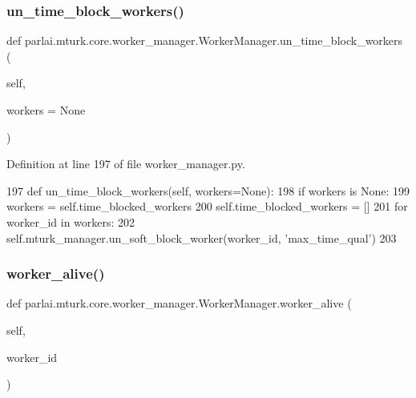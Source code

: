 \subsubsection{\texorpdfstring{un\+\_\+time\+\_\+block\+\_\+workers()}{un\_time\_block\_workers()}}
{\footnotesize\ttfamily def parlai.\+mturk.\+core.\+worker\+\_\+manager.\+Worker\+Manager.\+un\+\_\+time\+\_\+block\+\_\+workers (\begin{DoxyParamCaption}\item[{}]{self,  }\item[{}]{workers = {\ttfamily None} }\end{DoxyParamCaption})}



Definition at line 197 of file worker\+\_\+manager.\+py.


\begin{DoxyCode}
197     \textcolor{keyword}{def }un\_time\_block\_workers(self, workers=None):
198         \textcolor{keywordflow}{if} workers \textcolor{keywordflow}{is} \textcolor{keywordtype}{None}:
199             workers = self.time\_blocked\_workers
200             self.time\_blocked\_workers = []
201         \textcolor{keywordflow}{for} worker\_id \textcolor{keywordflow}{in} workers:
202             self.mturk\_manager.un\_soft\_block\_worker(worker\_id, \textcolor{stringliteral}{'max\_time\_qual'})
203 
\end{DoxyCode}
\mbox{\label{classparlai_1_1mturk_1_1core_1_1worker__manager_1_1WorkerManager_ae07d1e801e6436a33d2a19f32e41088a}} 
\subsubsection{\texorpdfstring{worker\+\_\+alive()}{worker\_alive()}}
{\footnotesize\ttfamily def parlai.\+mturk.\+core.\+worker\+\_\+manager.\+Worker\+Manager.\+worker\+\_\+alive (\begin{DoxyParamCaption}\item[{}]{self,  }\item[{}]{worker\+\_\+id }\end{DoxyParamCaption})}

